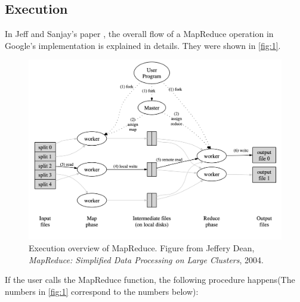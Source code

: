 \documentclass[sigconf, nonacm]{acmart}
\begin{document}
\subsection{Execution}
In Jeff and Sanjay's paper
\cite{62}, the overall flow of a MapReduce operation in Google's implementation is explained in details. They were shown in \autoref{fig:1}.

\begin{figure}
  \centering
  \includegraphics[width=\linewidth]{figures/1.png}
  \caption{Execution overview of MapReduce.  Figure from Jeffery Dean, \textit{MapReduce: Simplified Data Processing on Large Clusters}, 2004.}
  \label{fig:1}
\end{figure}

If the user calls the MapReduce function, the following procedure happens(The numbers in \autoref{fig:1} correspond to the numbers below):
\end{document}
